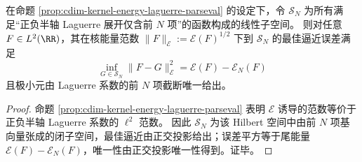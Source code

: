 \begin{proposition}\label{prop:cdim-kernel-energy-best-nterm}
在命题 \ref{prop:cdim-kernel-energy-laguerre-parseval} 的设定下，令 \(\mathcal S_N\) 为所有满足“正负半轴 Laguerre 展开仅含前 \(N\) 项”的函数构成的线性子空间。
则对任意 \(F\in L^2(\RR)\)，其在核能量范数 \(\|F\|_{\mathcal E}:=\mathcal E(F)^{1/2}\) 下到 \(\mathcal S_N\) 的最佳逼近误差满足
\[
\boxed{\;
\inf_{G\in\mathcal S_N}\|F-G\|_{\mathcal E}^{2}
=\mathcal E(F)-\mathcal E_N(F)\;}
\]
且极小元由 Laguerre 系数的前 \(N\) 项截断唯一给出。
\end{proposition}
\begin{proof}
命题 \ref{prop:cdim-kernel-energy-laguerre-parseval} 表明 \(\mathcal E\) 诱导的范数等价于正负半轴 Laguerre 系数的 \(\ell^2\) 范数。
因此 \(\mathcal S_N\) 为该 Hilbert 空间中由前 \(N\) 项基向量张成的闭子空间，最佳逼近由正交投影给出；误差平方等于尾能量 \(\mathcal E(F)-\mathcal E_N(F)\)，唯一性由正交投影唯一性得到。证毕。
\end{proof}

\endinput

